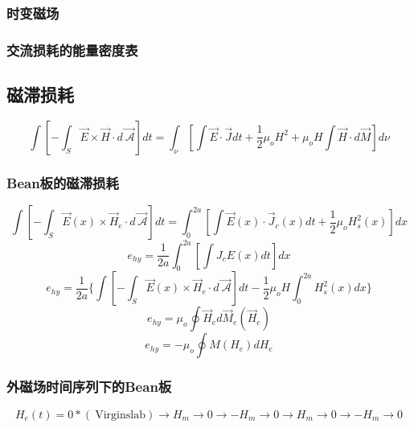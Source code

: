\subsubsection*{时变磁场}

\subsubsection*{交流损耗的能量密度表}

\subsection{磁滞损耗}

\begin{equation}%
\int\left[-\int_{S}^{}\vec{E}\times\vec{H}\cdot d\vec{\ \mathcal{A}}\right]dt=\int_{\nu}^{}\left[\int\vec{E}\cdot\vec{J}dt+\frac{1}{2}\mu_oH^2+\mu_oH\int\vec{H}\cdot d\vec{M}\right]d\nu
\end{equation}

\subsubsection*{Bean板的磁滞损耗}
\begin{equation}%
\int\left[-\int_{S}\vec{E}(x)\times\vec{H}_e\cdot d\vec{\ \mathcal{A}}\right]dt=\int_{0}^{2a}\left[\int\vec{E}(x)\cdot\vec{J}_c(x)dt+\frac{1}{2}\mu_oH_{s}^{2}(x)\right]dx
\end{equation}
\begin{equation}%
e_{hy}=\frac{1}{2a}\int_{0}^{2a}\left[\int J_cE(x)dt\right]dx
\end{equation}
\begin{equation}%
e_{hy}=\frac{1}{2a}\{\int\left[-\int_{S}\vec{E}(x)\times\vec{H}_e\cdot d\vec{\ \mathcal{A}}\right]dt-\frac{1}{2}\mu_oH\int_{0}^{2a}H_{s}^{2}(x)dx\}
\end{equation}
\begin{equation}%
e_{hy}=\mu_o\oint\vec{H}_ed\vec{M}_e(\vec{H}_e)
\end{equation}
\begin{equation}%
e_{hy}=-\mu_o\oint M(H_e)dH_e
\end{equation}


\subsubsection*{外磁场时间序列下的Bean板}
\begin{equation}%
H_e(t)=0*(\ \mathrm{Virgin slab})\rightarrow H_m\rightarrow 0\rightarrow -H_m\rightarrow 0\rightarrow H_m\rightarrow 0\rightarrow -H_m\rightarrow 0
\end{equation}


